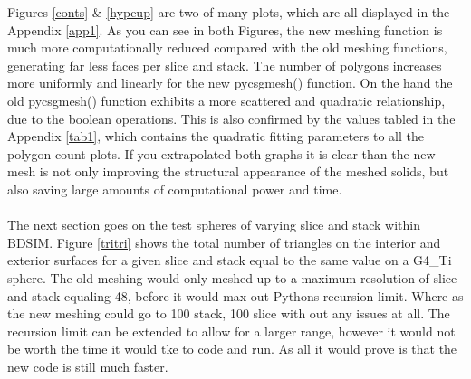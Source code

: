 \documentclass[12pt,a4paper]{article}
\begin{document}
\newpage
\noindent Figures \ref{conts} \& \ref{hypeup} are two of many plots, which are all displayed in the Appendix \ref{app1}. As you can see in  both Figures, the new meshing function is much more computationally reduced compared with the old meshing functions, generating far less faces per slice and stack. The number of polygons increases more uniformly and linearly for the new pycsgmesh() function. On the hand the old pycsgmesh() function exhibits a more scattered and quadratic relationship, due to the boolean operations. This is also confirmed by the values tabled in the Appendix \ref{tab1}, which contains the quadratic fitting parameters to all the polygon count plots. If you extrapolated both graphs it is clear than the new mesh is not only improving the structural appearance of the meshed solids, but also saving large amounts of computational power and time.
\\\\
\label{recur}
\noindent The next section goes on the test spheres of varying slice and stack within BDSIM. Figure \ref{tritri} shows the total number of triangles on the interior and exterior surfaces for a given slice and stack equal to the same value on a G4\_Ti sphere. The old meshing would only meshed up to a maximum resolution of slice and stack equaling 48, before it would max out Pythons recursion limit. Where as the new meshing could go to 100 stack, 100 slice with out any issues at all. The recursion limit can be extended to allow for a larger range, however it would not be worth the time it would tke to code and run. As all it would prove is that the new code is still much faster. 
\end{document}
